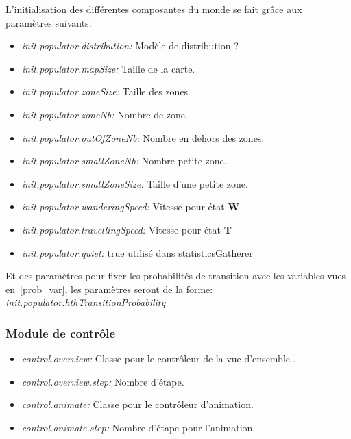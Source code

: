 \documentclass[11pt,a4paper]{article}
\begin{document}
L'initialisation des différentes composantes du monde se fait grâce aux paramètres suivants:
\begin{itemize}
        \renewcommand{\labelitemi}{$\bullet$}
	\item \textit{init.populator.distribution:} Modèle de distribution ?
	\item \textit{init.populator.mapSize:} Taille de la carte.
	\item \textit{init.populator.zoneSize:} Taille des zones.
	\item \textit{init.populator.zoneNb:} Nombre de zone.
	\item \textit{init.populator.outOfZoneNb:} Nombre en dehors des zones.
	\item \textit{init.populator.smallZoneNb:} Nombre petite zone.
	\item \textit{init.populator.smallZoneSize:} Taille d'une petite zone.
	\item \textit{init.populator.wanderingSpeed:} Vitesse pour état \textbf{W}
	\item \textit{init.populator.travellingSpeed:} Vitesse pour état \textbf{T} 
	\item \textit{init.populator.quiet:} true  utilisé dans statisticsGatherer
\end{itemize}
Et des paramètres pour fixer les probabilités de transition avec les variables vues en~\ref{prob_var}, les paramètres seront de la forme: \textit{init.populator.hthTransitionProbability} 

\subsubsection{Module de contrôle}
\begin{itemize}
        \renewcommand{\labelitemi}{$\bullet$}
	\item \textit{control.overview:} Classe pour le contrôleur de la vue d'ensemble .
	\item \textit{control.overview.step:} Nombre d'étape.
	\item \textit{control.animate:} Classe pour le contrôleur d'animation.
	\item \textit{control.animate.step:} Nombre d'étape pour l'animation.
\end{itemize}
\end{document}
